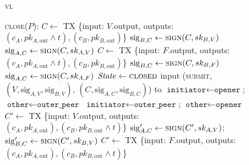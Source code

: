 \begin{figure}[H]
\begin{systembox}{\textsc{vl}}
\begin{algorithmic}[1]
      \State \textsc{close}($P$):
            \State {}
            \State $C \gets$ TX \{input: $V$.output, outputs: $(c_A, pk_{A,
            \mathrm{out}} \wedge t), (c_B, pk_{B, \mathrm{out}})$\}
            \State $\mathrm{sig}_{B, C} \gets \textsc{sign}(C, sk_{B, V})$
            \State $\mathrm{sig}_{A, C} \gets \textsc{sign}(C, sk_{A, V})$
          \Else
            \State $C \gets$ TX \{input: $F$.output, outputs: $(c_A, pk_{A,
            \mathrm{out}} \wedge t), (c_B, pk_{B, \mathrm{out}})$\}
            \State $\mathrm{sig}_{B, C} \gets \textsc{sign}(C, sk_{B, F})$
            \State $\mathrm{sig}_{A, C} \gets \textsc{sign}(C, sk_{A, F})$
          \EndIf
        \EndIf \: 
        \State $\mathit{State} \gets \textsc{closed}$
          \State input (\textsc{submit}, $(V, \mathrm{sig}_{A, V},
          \mathrm{sig}_{B, V})$, $(C, \mathrm{sig}_{A, C}, \mathrm{sig}_{B,
          C})$) to \ledger
        \Else \: 
            \State $\texttt{initiator} \gets \texttt{opener}$; $\texttt{other}
            \gets \texttt{outer\_peer}$
          \Else \: 
            \State $\texttt{initiator} \gets \texttt{outer\_peer}$;
            $\texttt{other} \gets \texttt{opener}$
          \EndIf
              \State {}
              \State $C' \gets$ TX \{input: $V$.output, outputs: $(c_A, pk_{A,
              \mathrm{out}}), (c_B, pk_{B, \mathrm{out}} \wedge t)$\}
              \State $\mathrm{sig}_{A, C}' \gets \textsc{sign}(C', sk_{A, V})$;
              $\mathrm{sig}_{B, C}' \gets \textsc{sign}(C', sk_{B, V})$
            \Else \: 
              \State $C' \gets$ TX \{input: $F$.output, outputs: $(c_A, pk_{A,
              \mathrm{out}}), (c_B, pk_{B, \mathrm{out}} \wedge t)$\}

\end{algorithmic}
\end{systembox}
\end{figure}
